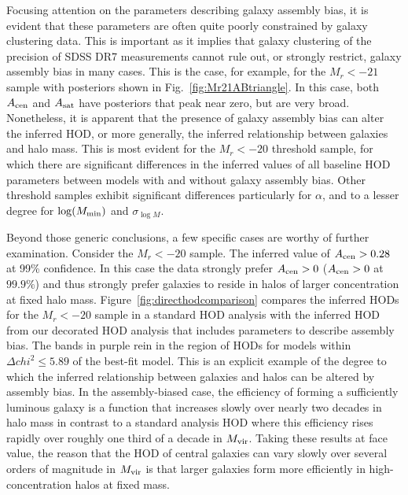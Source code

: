 \documentclass[usenatbib,usegraphicx,letterpaper]{mn2e}
\newcommand{\mvir}{M_{\rm vir}}
\begin{document}
Focusing attention on the parameters describing galaxy assembly bias, it is
evident that these parameters are often quite poorly constrained by galaxy
clustering data. This is important as it implies that galaxy clustering of the precision
of SDSS DR7 measurements cannot rule out, or strongly restrict, galaxy assembly
bias in many cases. This is the case, for example, for the $M_r<-21$ sample with posteriors
shown in Fig.~\ref{fig:Mr21ABtriangle}. In this case, both $A_{\rm cen}$ and
$A_{\rm sat}$ have posteriors that peak near zero, but are very broad.
Nonetheless, it is apparent that the presence of galaxy assembly bias
can alter the inferred HOD, or more generally, the inferred relationship between
galaxies and halo mass. This is most evident for the $M_r < -20$ threshold sample,
for which there are significant differences in the inferred values of all baseline HOD
parameters between models with and without galaxy assembly bias. Other threshold
samples exhibit significant differences particularly for $\alpha$, and to a lesser degree
for $\log (M_{\rm min})$ and $\sigma_{\log M}$.


Beyond those generic conclusions, a few specific cases are worthy of further examination.
Consider the $M_r < -20$ sample. The inferred value of $A_{\rm cen} > 0.28$ at 99\%
confidence. In this case the data strongly prefer $A_{\rm cen} > 0$ ($A_{\rm cen} > 0$ at $99.9\%$) 
and thus strongly prefer galaxies to reside in halos of larger concentration at fixed halo mass. 
Figure~\ref{fig:directhodcomparison}
compares the inferred HODs for the $M_r<-20$ sample in a standard HOD analysis with the
inferred HOD from our decorated HOD analysis that includes parameters to describe
assembly bias. The bands in purple rein in the region of HODs for models within 
$\Delta chi^2 \le 5.89$ of the best-fit model. 
This is an explicit example of the degree to which the inferred relationship
between galaxies and halos can be altered by assembly bias. In the assembly-biased case, the efficiency 
of forming a sufficiently luminous galaxy is a function that increases slowly over nearly two 
decades in halo mass in contrast to a standard analysis HOD where this efficiency rises 
rapidly over roughly one third of a decade in $\mvir$. Taking these results at face value, 
the reason that the HOD of central galaxies can vary slowly over several orders of magnitude 
in $\mvir$ is that larger galaxies form more efficiently in high-concentration halos at fixed 
mass. 
\end{document}
